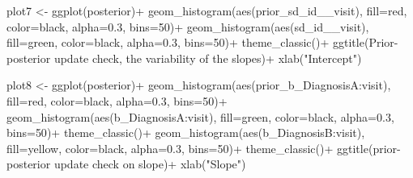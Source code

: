 \documentclass[
]{article}
\newenvironment{Shaded}{\begin{snugshade}}{\end{snugshade}}
\newcommand{\AttributeTok}[1]{\textcolor[rgb]{0.77,0.63,0.00}{#1}}
\newcommand{\DecValTok}[1]{\textcolor[rgb]{0.00,0.00,0.81}{#1}}
\newcommand{\FloatTok}[1]{\textcolor[rgb]{0.00,0.00,0.81}{#1}}
\newcommand{\FunctionTok}[1]{\textcolor[rgb]{0.00,0.00,0.00}{#1}}
\newcommand{\NormalTok}[1]{#1}
\newcommand{\OtherTok}[1]{\textcolor[rgb]{0.56,0.35,0.01}{#1}}
\newcommand{\SpecialCharTok}[1]{\textcolor[rgb]{0.00,0.00,0.00}{#1}}
\newcommand{\StringTok}[1]{\textcolor[rgb]{0.31,0.60,0.02}{#1}}
\begin{document}
\begin{Shaded}
\begin{Highlighting}[]
\NormalTok{plot7 }\OtherTok{\textless{}{-}} \FunctionTok{ggplot}\NormalTok{(posterior)}\SpecialCharTok{+}
  \FunctionTok{geom\_histogram}\NormalTok{(}\FunctionTok{aes}\NormalTok{(prior\_sd\_id\_\_visit), }\AttributeTok{fill=}\StringTok{\textquotesingle{}red\textquotesingle{}}\NormalTok{, }\AttributeTok{color=}\StringTok{\textquotesingle{}black\textquotesingle{}}\NormalTok{, }\AttributeTok{alpha=}\FloatTok{0.3}\NormalTok{, }\AttributeTok{bins=}\DecValTok{50}\NormalTok{)}\SpecialCharTok{+}
  \FunctionTok{geom\_histogram}\NormalTok{(}\FunctionTok{aes}\NormalTok{(sd\_id\_\_visit), }\AttributeTok{fill=}\StringTok{\textquotesingle{}green\textquotesingle{}}\NormalTok{, }\AttributeTok{color=}\StringTok{\textquotesingle{}black\textquotesingle{}}\NormalTok{, }\AttributeTok{alpha=}\FloatTok{0.3}\NormalTok{, }\AttributeTok{bins=}\DecValTok{50}\NormalTok{)}\SpecialCharTok{+}
  \FunctionTok{theme\_classic}\NormalTok{()}\SpecialCharTok{+}
  \FunctionTok{ggtitle}\NormalTok{(}\StringTok{\textquotesingle{}Prior{-}posterior update check, the variability of the slopes\textquotesingle{}}\NormalTok{)}\SpecialCharTok{+}
  \FunctionTok{xlab}\NormalTok{(}\StringTok{"Intercept"}\NormalTok{)}

\NormalTok{plot8 }\OtherTok{\textless{}{-}} \FunctionTok{ggplot}\NormalTok{(posterior)}\SpecialCharTok{+}
  \FunctionTok{geom\_histogram}\NormalTok{(}\FunctionTok{aes}\NormalTok{(}\StringTok{\textasciigrave{}}\AttributeTok{prior\_b\_DiagnosisA:visit}\StringTok{\textasciigrave{}}\NormalTok{), }\AttributeTok{fill=}\StringTok{\textquotesingle{}red\textquotesingle{}}\NormalTok{, }\AttributeTok{color=}\StringTok{\textquotesingle{}black\textquotesingle{}}\NormalTok{, }\AttributeTok{alpha=}\FloatTok{0.3}\NormalTok{, }\AttributeTok{bins=}\DecValTok{50}\NormalTok{)}\SpecialCharTok{+}
  \FunctionTok{geom\_histogram}\NormalTok{(}\FunctionTok{aes}\NormalTok{(}\StringTok{\textasciigrave{}}\AttributeTok{b\_DiagnosisA:visit}\StringTok{\textasciigrave{}}\NormalTok{), }\AttributeTok{fill=}\StringTok{\textquotesingle{}green\textquotesingle{}}\NormalTok{, }\AttributeTok{color=}\StringTok{\textquotesingle{}black\textquotesingle{}}\NormalTok{, }\AttributeTok{alpha=}\FloatTok{0.3}\NormalTok{, }\AttributeTok{bins=}\DecValTok{50}\NormalTok{)}\SpecialCharTok{+}
  \FunctionTok{theme\_classic}\NormalTok{()}\SpecialCharTok{+}
  \FunctionTok{geom\_histogram}\NormalTok{(}\FunctionTok{aes}\NormalTok{(}\StringTok{\textasciigrave{}}\AttributeTok{b\_DiagnosisB:visit}\StringTok{\textasciigrave{}}\NormalTok{), }\AttributeTok{fill=}\StringTok{\textquotesingle{}yellow\textquotesingle{}}\NormalTok{, }\AttributeTok{color=}\StringTok{\textquotesingle{}black\textquotesingle{}}\NormalTok{, }\AttributeTok{alpha=}\FloatTok{0.3}\NormalTok{, }\AttributeTok{bins=}\DecValTok{50}\NormalTok{)}\SpecialCharTok{+}
  \FunctionTok{theme\_classic}\NormalTok{()}\SpecialCharTok{+}
  \FunctionTok{ggtitle}\NormalTok{(}\StringTok{\textquotesingle{}prior{-}posterior update check on slope\textquotesingle{}}\NormalTok{)}\SpecialCharTok{+}
  \FunctionTok{xlab}\NormalTok{(}\StringTok{"Slope"}\NormalTok{)}


\end{Highlighting}
\end{Shaded}
\end{document}
